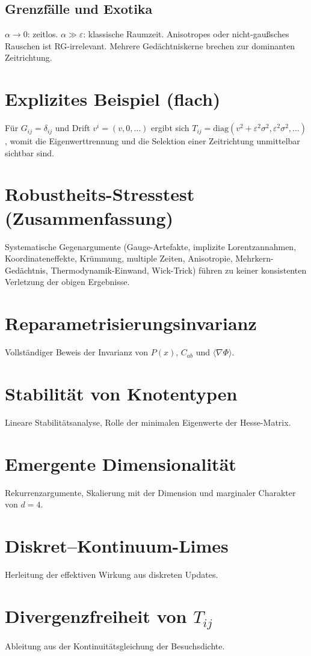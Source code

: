 \documentclass[11pt,a4paper]{article}
\begin{document}
\subsection{Grenzf\"alle und Exotika}
$\alpha\to0$: zeitlos. $\alpha\gg\varepsilon$: klassische Raumzeit. Anisotropes oder nicht-gau\ss sches Rauschen ist RG-irrelevant. Mehrere Ged\"achtniskerne brechen zur dominanten Zeitrichtung.

\section{Explizites Beispiel (flach)}
F\"ur $G_{ij}=\delta_{ij}$ und Drift $v^i=(v,0,\dots)$ ergibt sich $T_{ij}=\mathrm{diag}(v^2+\varepsilon^2\sigma^2,\varepsilon^2\sigma^2,\dots)$, womit die Eigenwerttrennung und die Selektion einer Zeitrichtung unmittelbar sichtbar sind.

\section{Robustheits-Stresstest (Zusammenfassung)}
Systematische Gegenargumente (Gauge-Artefakte, implizite Lorentzannahmen, Koordinateneffekte, Kr\"ummung, multiple Zeiten, Anisotropie, Mehrkern-Ged\"achtnis, Thermodynamik-Einwand, Wick-Trick) f\"uhren zu keiner konsistenten Verletzung der obigen Ergebnisse.


\section{Reparametrisierungsinvarianz}

Vollständiger Beweis der Invarianz von $P(x)$, $C_{ab}$ und $\langle \nabla \Phi \rangle$.

\section{Stabilit\"at von Knotentypen}

Lineare Stabilitätsanalyse, Rolle der minimalen Eigenwerte der Hesse-Matrix.

\section{Emergente Dimensionalit\"at}

Rekurrenzargumente, Skalierung mit der Dimension und marginaler Charakter von $d=4$.

\section{Diskret--Kontinuum-Limes}

Herleitung der effektiven Wirkung aus diskreten Updates.

\section{Divergenzfreiheit von $T_{ij}$}

Ableitung aus der Kontinuitätsgleichung der Besuchsdichte.



\end{document}

